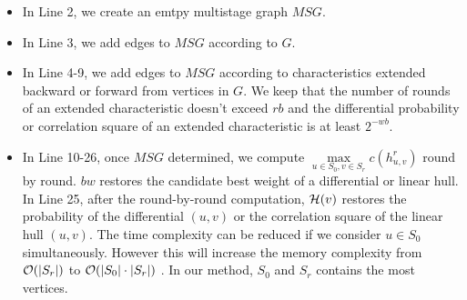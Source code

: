\begin{itemize}
    \item In Line 2, we create an emtpy multistage graph $MSG$. 
    \item In Line 3, we add edges to $MSG$ according to $G$. 
    \item In Line 4-9, we add edges to $MSG$ according to characteristics extended backward or forward from vertices in $G$. We keep that the number of rounds of an extended characteristic doesn't exceed $rb$ and the differential probability or correlation square of an extended characteristic is at least $2^{-wb}$. 
    \item In Line 10-26, once $MSG$ determined, we compute $\max\limits_{u\in S_0,v\in S_r} c(h^r_{u,v})$ round by round. $bw$ restores the candidate best weight of a differential or linear hull. In Line 25, after the round-by-round computation, $\mathcal{H}(v)$ restores the probability of the differential $(u,v)$ or the correlation square of the linear hull $(u,v)$. The time complexity can be reduced if we consider $u\in S_0$ simultaneously. However this will increase the memory complexity from $\mathcal{O}(|S_r|)$ to $\mathcal{O}(|S_0|\cdot|S_r|)$ \cite{EPRINT:HalVej18}. In our method, $S_0$ and $S_r$ contains the most vertices. 
\end{itemize}

